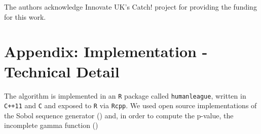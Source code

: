 \documentclass{JASSS}
\begin{document}
The authors acknowledge Innovate UK's Catch! project for providing the
funding for this work.







\endparano




\section{Appendix: Implementation - Technical Detail} 
The algorithm is implemented in an \texttt{R} package called
\texttt{humanleague}, written in \texttt{C++11} and \texttt{C} and
exposed to \texttt{R} via \texttt{Rcpp}. We used open source
implementations of the Sobol sequence generator (\cite{johnson_stevengj/nlopt:_nodate}) and, in order to 
compute the p-value, the
incomplete gamma function (\cite{burkardt_asa032_2008})
\end{document}
